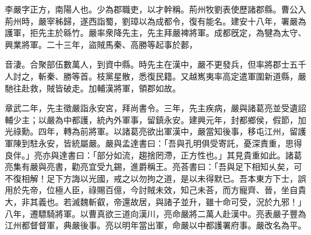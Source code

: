 
\begin{pinyinscope}
李嚴字正方，南陽人也。少為郡職吏，以才幹稱。荊州牧劉表使歷諸郡縣。曹公入荊州時，嚴宰秭歸，遂西詣蜀，劉璋以為成都令，復有能名。建安十八年，署嚴為護軍，拒先主於緜竹。嚴率衆降先主，先主拜嚴裨將軍。成都旣定，為犍為太守、興業將軍。二十三年，盜賊馬秦、高勝等起事於郪，

音淒。合聚部伍數萬人，到資中縣。時先主在漢中，嚴不更發兵，但率將郡士五千人討之，斬秦、勝等首。枝黨星散，悉復民籍。又越嶲夷率高定遣軍圍新道縣，嚴馳往赴救，賊皆破走。加輔漢將軍，領郡如故。

章武二年，先主徵嚴詣永安宮，拜尚書令。三年，先主疾病，嚴與諸葛亮並受遺詔輔少主；以嚴為中都護，統內外軍事，留鎮永安。建興元年，封都鄉侯，假節，加光祿勳。四年，轉為前將軍。以諸葛亮欲出軍漢中，嚴當知後事，移屯江州，留護軍陳到駐永安，皆統屬嚴。嚴與孟達書曰：「吾與孔明俱受寄託，憂深責重，思得良伴。」亮亦與達書曰：「部分如流，趨捨罔滯，正方性也。」其見貴重如此。諸葛亮集有嚴與亮書，勸亮宜受九錫，進爵稱王。亮荅書曰：「吾與足下相知乆矣，可不復相解！足下方誨以光國，戒之以勿拘之道，是以未得默已。吾本東方下士，誤用於先帝，位極人臣，祿賜百億，今討賊未效，知己未荅，而方寵齊、晉，坐自貴大，非其義也。若滅魏斬叡，帝還故居，與諸子並升，雖十命可受，況於九邪！」八年，遷驃騎將軍。以曹真欲三道向漢川，亮命嚴將二萬人赴漢中。亮表嚴子豐為江州都督督軍，典嚴後事。亮以明年當出軍，命嚴以中都護署府事。嚴改名為平。


\end{pinyinscope}
